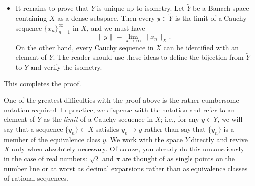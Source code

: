 \begin{Proof}
\begin{itemize}
\item It remains to prove that $Y$ is unique up to isometry. Let $\widetilde Y$ be a Banach space containing $X$ as a dense subspace. Then every $y\in\widetilde Y$ is the limit of a Cauchy sequence $\{x_n\}_{n=1}^\infty$ in $X$, and we must have
\begin{equation}\label{eq:completion-isometry-unique-norm}
\|y\|=\lim_{n\to\infty}\|x_n\|_X.
\end{equation}
On the other hand, every Cauchy sequence in $X$ can be identified with an element of $Y$. The reader should use these ideas to define the bijection from $\widetilde Y$ to $Y$ and verify the isometry.\end{itemize}
This completes the proof.
\end{Proof}
\endgroup

\begin{Remark}
\label{rem:completion-limit-notation}
One of the greatest difficulties with the proof above is the rather cumbersome notation required. In practice, we dispense with the notation and refer to an element of $Y$ as the \emph{limit} of a Cauchy sequence in $X$; i.e., for any $y\in Y$, we will say that a sequence $\{y_n\}\subset X$ satisfies $y_n\to y$ rather than say that $\{y_n\}$ is a member of the equivalence class $y$. We work with the space $Y$ directly and revive $X$ only when absolutely necessary. Of course, you already do this unconsciously in the case of real numbers: $\sqrt2$ and $\pi$ are thought of as single points on the number line or at worst as decimal expansions rather than as equivalence classes of rational sequences.
\end{Remark}
